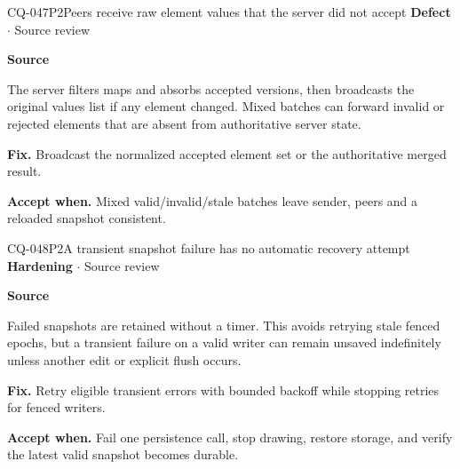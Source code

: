 \begin{finding}{CQ-047}{P2}{Peers receive raw element values that the server did not accept}
\textbf{Defect} $\cdot$ Source review\par
\textbf{Source}\quad{}\par
The server filters maps and absorbs accepted versions, then broadcasts the original values list if any element changed. Mixed batches can forward invalid or rejected elements that are absent from authoritative server state.\par
\textbf{Fix.} Broadcast the normalized accepted element set or the authoritative merged result.\par
\textbf{Accept when.} Mixed valid/invalid/stale batches leave sender, peers and a reloaded snapshot consistent.
\end{finding}
\begin{finding}{CQ-048}{P2}{A transient snapshot failure has no automatic recovery attempt}
\textbf{Hardening} $\cdot$ Source review\par
\textbf{Source}\quad{}\par
Failed snapshots are retained without a timer. This avoids retrying stale fenced epochs, but a transient failure on a valid writer can remain unsaved indefinitely unless another edit or explicit flush occurs.\par
\textbf{Fix.} Retry eligible transient errors with bounded backoff while stopping retries for fenced writers.\par
\textbf{Accept when.} Fail one persistence call, stop drawing, restore storage, and verify the latest valid snapshot becomes durable.
\end{finding}
\clearpage
